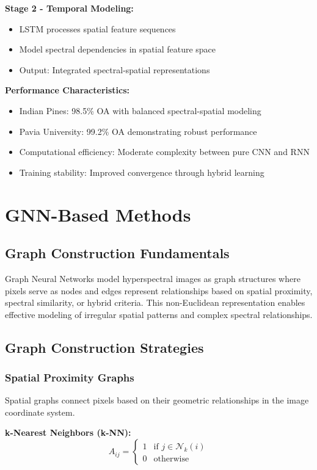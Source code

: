 \documentclass[journal]{IEEEtran}
\begin{document}
\textbf{Stage 2 - Temporal Modeling:}
\begin{itemize}
\item LSTM processes spatial feature sequences
\item Model spectral dependencies in spatial feature space
\item Output: Integrated spectral-spatial representations
\end{itemize}

\textbf{Performance Characteristics:}
\begin{itemize}
\item Indian Pines: 98.5\% OA with balanced spectral-spatial modeling
\item Pavia University: 99.2\% OA demonstrating robust performance
\item Computational efficiency: Moderate complexity between pure CNN and RNN
\item Training stability: Improved convergence through hybrid learning
\end{itemize}

\section{GNN-Based Methods}

\subsection{Graph Construction Fundamentals}

Graph Neural Networks model hyperspectral images as graph structures where pixels serve as nodes and edges represent relationships based on spatial proximity, spectral similarity, or hybrid criteria. This non-Euclidean representation enables effective modeling of irregular spatial patterns and complex spectral relationships.

\subsection{Graph Construction Strategies}

\subsubsection{Spatial Proximity Graphs}

Spatial graphs connect pixels based on their geometric relationships in the image coordinate system.

\textbf{k-Nearest Neighbors (k-NN):}
\begin{equation}
A_{ij} = \begin{cases}
1 & \text{if } j \in \mathcal{N}_k(i) \\
0 & \text{otherwise}
\end{cases}
\end{equation}
\end{document}
